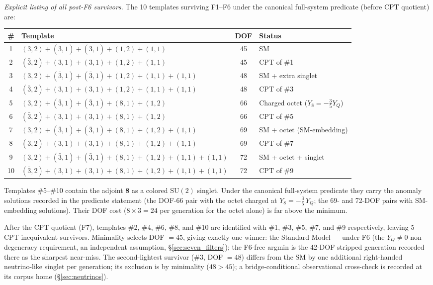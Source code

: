 \documentclass[11pt]{article}
\theoremstyle{definition}
\newcommand{\SU}{\mathrm{SU}}
\begin{document}
\smallskip\noindent\textit{Explicit listing of all post-F6 survivors.}\quad
The 10 templates surviving F1--F6 under the canonical full-system
predicate (before CPT quotient) are:

\smallskip
\begin{center}\small
\renewcommand{\arraystretch}{1.15}
\begin{tabular}{@{}clcl@{}}
\toprule
\# & Template & DOF & Status \\
\midrule
1 & $(3,2) + (\bar{3},1) + (\bar{3},1) + (1,2) + (1,1)$ & 45 & SM \\
2 & $(\bar{3},2) + (3,1) + (3,1) + (1,2) + (1,1)$ & 45 & CPT of \#1 \\
3 & $(3,2) + (\bar{3},1) + (\bar{3},1) + (1,2) + (1,1) + (1,1)$ & 48 & SM + extra singlet \\
4 & $(\bar{3},2) + (3,1) + (3,1) + (1,2) + (1,1) + (1,1)$ & 48 & CPT of \#3 \\
5 & $(3,2) + (\bar{3},1) + (\bar{3},1) + (8,1) + (1,2)$ & 66 & Charged octet ($Y_8 = -\tfrac{3}{5}Y_Q$) \\
6 & $(\bar{3},2) + (3,1) + (3,1) + (8,1) + (1,2)$ & 66 & CPT of \#5 \\
7 & $(3,2) + (\bar{3},1) + (\bar{3},1) + (8,1) + (1,2) + (1,1)$ & 69 & SM + octet (SM-embedding) \\
8 & $(\bar{3},2) + (3,1) + (3,1) + (8,1) + (1,2) + (1,1)$ & 69 & CPT of \#7 \\
9 & $(3,2) + (\bar{3},1) + (\bar{3},1) + (8,1) + (1,2) + (1,1) + (1,1)$ & 72 & SM + octet + singlet \\
10 & $(\bar{3},2) + (3,1) + (3,1) + (8,1) + (1,2) + (1,1) + (1,1)$ & 72 & CPT of \#9 \\
\bottomrule
\end{tabular}
\end{center}

\smallskip\noindent Templates \#5--\#10 contain the adjoint
$\mathbf{8}$ as a colored $\SU(2)$ singlet.  Under the canonical
full-system predicate they carry the anomaly solutions recorded in
the predicate statement (the DOF-66 pair with the octet charged at
$Y_8 = -\tfrac{3}{5}\,Y_Q$; the 69- and 72-DOF pairs with
SM-embedding solutions).  Their DOF cost ($8 \times 3 = 24$ per
generation for the octet alone) is far above the minimum.

\smallskip\noindent After the CPT quotient (F7), templates \#2, \#4,
\#6, \#8, and \#10 are identified with \#1, \#3, \#5, \#7, and \#9
respectively, leaving 5 CPT-inequivalent survivors.  Minimality selects DOF $= 45$,
giving exactly one winner: the Standard Model --- under F6
(the $Y_Q \neq 0$ non-degeneracy requirement, an independent
assumption, \S\ref{sec:seven_filters}); the F6-free argmin is the 42-DOF stripped
generation recorded there as the sharpest near-miss.  The second-lightest
survivor (\#3, DOF $= 48$) differs from the SM by one additional
right-handed neutrino-like singlet per generation;
its exclusion is by minimality ($48 > 45$); a bridge-conditional
observational cross-check is recorded at its corpus home
(\S\ref{sec:neutrinos}).
\end{document}
